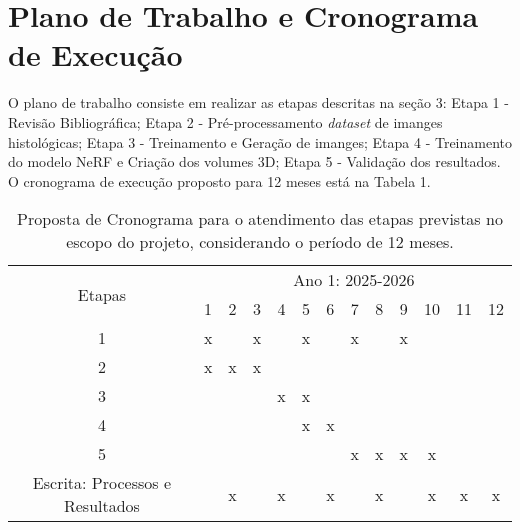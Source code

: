 \section{Plano de Trabalho e Cronograma de Execução}


O plano de trabalho consiste em realizar as etapas descritas na seção 3: Etapa 1 - Revisão Bibliográfica; Etapa 2 - Pré-processamento \textit{dataset} de imanges histológicas; Etapa 3 - Treinamento e Geração de imanges; Etapa 4 - Treinamento do modelo NeRF e Criação dos volumes 3D; Etapa 5 - Validação dos resultados. O cronograma de execução proposto para 12 meses está na Tabela 1. 

\begin{table}[h]

\caption{Proposta de Cronograma para o atendimento das etapas previstas no escopo do projeto, considerando o período de 12 meses.}

\label{tab:cronograma}
	\centering
		\begin{tabular} {|c|c|c|c|c|c|c|c|c|c|c|c|c|}
		\hline
		\multirow{2}{*}{Etapas}
		&\multicolumn{12}{c|}{Ano 1: 2025-2026}\\ \cline{2-13}
		&1&2&3&4&5&6&7&8&9&10&11&12\\
		\hline
		1&x&&x&&x&&x&&x&&&\\
		\hline
		2&x&x&x&&&&&&&&&\\
		\hline	
		3&&&&x&x&&&&&&&\\
		\hline			
		4&&&&&x&x&&&&&&\\
		\hline	
		5&&&&&&&x&x&x&x&&\\
		\hline	
		

		Escrita: Processos e Resultados&&x&&x&&x&&x&&x&x&x\\
		\hline
		\end{tabular}
\end{table}
